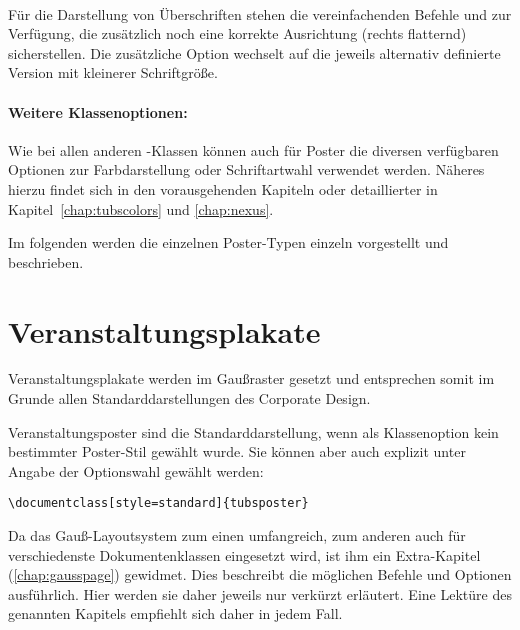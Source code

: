 \begin{Declaration}
  \\
\end{Declaration}

Für die Darstellung von Überschriften stehen die vereinfachenden
Befehle  und  zur Verfügung,
die zusätzlich noch eine korrekte Ausrichtung (rechts flatternd) sicherstellen.
Die zusätzliche Option  wechselt auf die jeweils alternativ
definierte Version mit kleinerer Schriftgröße.


\paragraph{Weitere Klassenoptionen:}

Wie bei allen anderen \tubslatex-Klassen können auch für Poster
die diversen verfügbaren Optionen zur Farbdarstellung oder Schriftartwahl
verwendet werden.
Näheres hierzu findet sich in den vorausgehenden Kapiteln oder detaillierter
in Kapitel~\ref{chap:tubscolors} und \ref{chap:nexus}.
\bigskip

Im folgenden werden die einzelnen Poster-Typen einzeln vorgestellt und beschrieben.

\clearpage
\section{Veranstaltungsplakate}

Veranstaltungsplakate werden im Gaußraster gesetzt und entsprechen somit
im Grunde allen Standarddarstellungen des Corporate Design.

Veranstaltungsposter sind die Standarddarstellung, wenn als Klassenoption
kein bestimmter Poster-Stil gewählt wurde. Sie können aber auch explizit
unter Angabe der Optionswahl  gewählt werden:
\begin{lstlisting}
\documentclass[style=standard]{tubsposter}
\end{lstlisting}

Da das Gauß-Layoutsystem zum einen umfangreich, zum anderen auch für
verschiedenste Dokumentenklassen eingesetzt wird,
ist ihm ein Extra-Kapitel (\ref{chap:gausspage}) gewidmet.
Dies beschreibt die möglichen Befehle und Optionen ausführlich.
Hier werden sie daher jeweils nur verkürzt erläutert.
Eine Lektüre des genannten Kapitels empfiehlt sich daher in jedem Fall.



